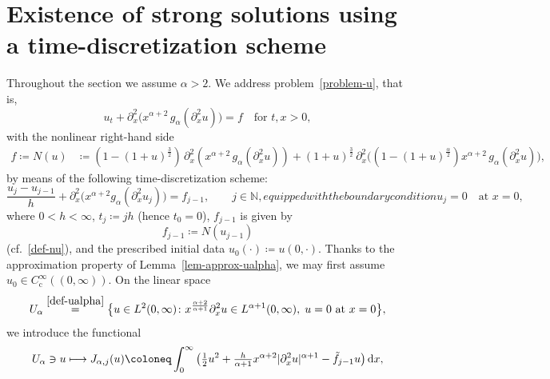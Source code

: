 \documentclass[reqno,12pt]{amsart}
\renewcommand{\d}{\ensuremath{\mathrm{d}}}
\newcommand{\N}{\ensuremath{\mathbb{N}}}
\renewcommand{\d}{\ensuremath{{\rm d}}}
\numberwithin{equation}{section}
\begin{document}
\section{Existence of strong solutions using a time-discretization scheme} \label{sec:time-discretization}
%
Throughout the section we assume $\alpha > 2$. We address problem~\eqref{problem-u}, that is,
\begin{equation*}
u_t + \partial_x^2 \big(x^{\alpha+2} \, g_\alpha(\partial_x^2 u)\big) = f \quad \text{for } t,x > 0,
\end{equation*}
%
with the nonlinear right-hand side
%
\begin{align*}
    f\coloneqq
    N(u) &\coloneqq (1-  (1+u)^{\frac{3}{2}}) \,  \partial_x^2 (x^{\alpha+2} \, g_{\alpha}(\partial_x^2 u))
    + (1+u)^{\frac{3}{2}}\, \partial_x^2\big( (1- (1+u)^{\frac{\alpha}{2}}) x^{\alpha+2} \, g_{\alpha}(\partial_x^2 u) \big),
\end{align*}
%
by means of the following time-discretization scheme:
%
\begin{subequations}\label{full-discrete}
\begin{equation}\label{eq-full-discrete}
\frac{u_j - u_{j-1}}{h} + \partial_x^2 \big(x^{\alpha+2} g_\alpha(\partial_x^2 u_j)\big) = f_{j-1}, \qquad j \in \N,
\end{equation}
%
equipped with the boundary condition 
%
\begin{equation}\label{bc-full-discrete}
u_j = 0 \quad \text{at } x = 0,
\end{equation}
\end{subequations}
%
where $0 < h < \infty$, $t_j\coloneq jh$ (hence $t_0 =0$), $f_{j-1}$ is given by
%
\begin{equation}\label{def-fj}
f_{j-1} \coloneq N(u_{j-1})
\end{equation}
%
(cf.~\eqref{def-nu}), and the prescribed initial data 
$u_0(\cdot)\coloneq u(0,\cdot)$. Thanks to the approximation property of Lemma~\ref{lem-approx-ualpha}, we may first assume $u_0 \in C_\mathrm{c}^\infty((0,\infty))$.
%
On the linear space
%
\[
U_\alpha \stackrel{\eqref{def-ualpha}}{=} \big\{u \in L^2(0,\infty) \colon x^{\frac{\alpha+2}{\alpha+1}} \partial_x^2 u \in L^{\alpha+1}(0,\infty), \; u = 0 \text{ at } x = 0\big\},
\]
%
we introduce the functional 
%
\begin{equation}\label{def-jalpha}
U_\alpha \owns u \longmapsto J_{\alpha,j}(u) \coloneq \int_0^\infty \big(\tfrac 1 2 u^2 + \tfrac{h}{\alpha+1} x^{\alpha+2} |\partial_x^2 u|^{\alpha+1} - \tilde f_{j-1} u\big) \, \d x,
\end{equation}
\end{document}
